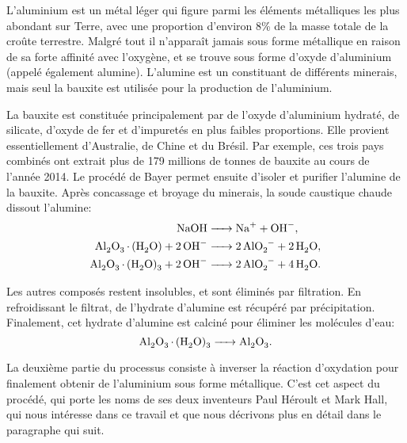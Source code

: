 L'aluminium est un métal léger qui figure parmi les éléments
métalliques les plus abondant sur Terre, avec une proportion d'environ
\num{8}\% de la masse totale de la croûte terrestre. Malgré tout il
n'apparaît jamais sous forme métallique en raison de sa forte affinité
avec l'oxygène, et se trouve sous forme d'oxyde d'aluminium 
(appelé également alumine). L'alumine est un constituant de différents
minerais, mais seul la bauxite est utilisée pour la production de
l'aluminium.

La bauxite est constituée principalement par de l'oxyde d'aluminium
hydraté, de silicate, d'oxyde de fer et d'impuretés en plus faibles
proportions. Elle provient essentiellement d'Australie, de Chine et du
Brésil. Par exemple, ces trois pays combinés ont extrait plus de
\num{179} millions de tonnes de bauxite au cours de l'année
\num{2014}. Le procédé de Bayer permet ensuite d'isoler et purifier
l'alumine de la bauxite. Après concassage et broyage du minerais, la
soude caustique chaude dissout l'alumine:
\begin{align*}
  \cee{NaOH &-> Na+ + OH-},\\
  \cee{Al2O3.(H2O) + 2OH- &-> 2AlO2- + 2H2O},\\
  \cee{Al2O3.(H2O)3 + 2OH- &-> 2AlO2- + 4H2O}.
\end{align*}

Les autres composés restent insolubles, et sont éliminés par
filtration. En refroidissant le filtrat, de l'hydrate d'alumine est
récupéré par précipitation. Finalement, cet hydrate d'alumine est
calciné pour éliminer les molécules d'eau:
\begin{equation*}
  \cee{Al2O3.(H2O)3 -> Al2O3}.
\end{equation*}

La deuxième partie du processus consiste à inverser la réaction
d'oxydation pour finalement obtenir de l'aluminium sous forme
métallique. C'est cet aspect du procédé, qui porte les noms de ses
deux inventeurs Paul Héroult et Mark Hall, qui nous intéresse dans
ce travail et que nous décrivons plus en détail dans le paragraphe
qui suit.
